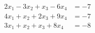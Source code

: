 \begin{align*}
2x_1  - 3x_2 + x_3 - 6x_4 &= -7 \\
4x_1 +x_2 +2x_3 + 9x_4 &=  -7 \\
3x_1 +x_2 +x_3 + 8x_4 &=  -8  
\end{align*}